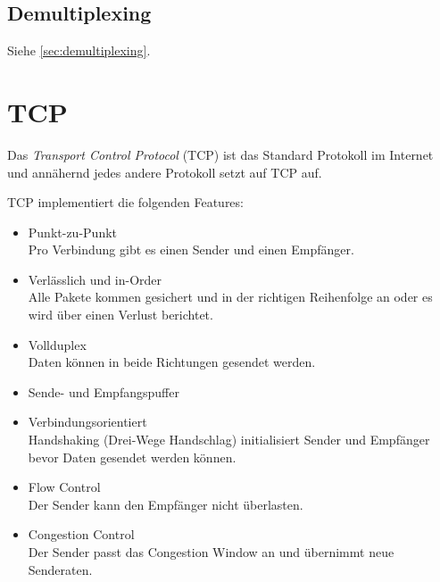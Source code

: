         \subsection{Demultiplexing} %
            Siehe \ref{sec:demultiplexing}.

    \section{TCP}
        Das \textit{Transport Control Protocol} (TCP) ist das Standard Protokoll im Internet und annähernd jedes andere Protokoll setzt auf TCP auf.
        
        TCP implementiert die folgenden Features:
        \begin{itemize}
        	\item Punkt-zu-Punkt \\ Pro Verbindung gibt es einen Sender und einen Empfänger.
        	\item Verlässlich und in-Order \\ Alle Pakete kommen gesichert und in der richtigen Reihenfolge an oder es wird über einen Verlust berichtet.
        	\item Vollduplex \\ Daten können in beide Richtungen gesendet werden.
        	\item Sende- und Empfangspuffer
        	\item Verbindungsorientiert \\ Handshaking (Drei-Wege Handschlag) initialisiert Sender und Empfänger bevor Daten gesendet werden können.
        	\item Flow Control \\ Der Sender kann den Empfänger nicht überlasten.
        	\item Congestion Control \\ Der Sender passt das Congestion Window an und übernimmt neue Senderaten.
        \end{itemize}

